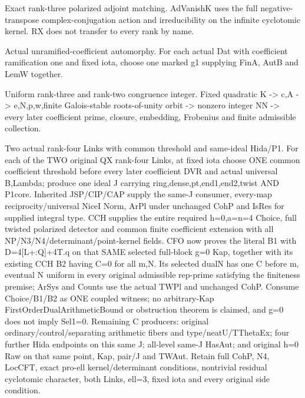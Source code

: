 \begin{description}[style=nextline]
\item[10. AD\_VANISH\_K\_MATCH --- D] Exact rank-three polarized adjoint matching. AdVanishK uses the full negative-transpose complex-conjugation action and irreducibility on the infinite cyclotomic kernel. RX does not transfer to every rank by name.

\item[11. AUT\_UNRAM\_COEF --- C] Actual unramified-coefficient automorphy. For each actual Dat with coefficient ramification one and fixed iota, choose one marked g1 supplying FinA, AutB and LemW together.

\item[12. CNR3 --- C] Uniform rank-three and rank-two congruence integer. Fixed quadratic K -> c,A -> e,N,p,w,finite Galois-stable roots-of-unity orbit -> nonzero integer NN -> every later coefficient prime, closure, embedding, Frobenius and finite admissible collection.

\item[13. COUNT\_II\_SUPPORT --- C] Two actual rank-four Links with common threshold and same-ideal Hida/P1. For each of the TWO original QX rank-four Links, at fixed iota choose ONE common coefficient threshold before every later coefficient DVR and actual universal B,Lambda; produce one ideal J carrying ring,dense,pt,end1,end2,twist AND P1core. Inherited JSP/CIP/CAP supply the same-J consumer, every-map reciprocity/universal NiceI Norm, ArPl under unchanged CohP and IsRes for supplied integral type. CCH supplies the entire required h=0,a=n=4 Choice, full twisted polarized detector and common finite coefficient extension with all NP/N3/N4/determinant/point-kernel fields. CFO now proves the literal B1 with D=4[L+:Q]+4T.q on that SAME selected full-block g=0 Kap, together with its existing CCH B2 having C=0 for all m,N. Its selected dualN has one C before m, eventual N uniform in every original admissible rep-prime satisfying the finiteness premise; ArSys and Counts use the actual TWPl and unchanged CohP. Consume Choice/B1/B2 as ONE coupled witness; no arbitrary-Kap FirstOrderDualArithmeticBound or obstruction theorem is claimed, and g=0 does not imply Sel1=0. Remaining C producers: original ordinary/control/separating arithmetic fibers and type/neatU/TThetaEx; four further Hida endpoints on this same J; all-level same-J HasAut; and original h=0 Raw on that same point, Kap, pair/J and TWAut. Retain full CohP, N4, LocCFT, exact pro-ell kernel/determinant conditions, nontrivial residual cyclotomic character, both Links, ell=3, fixed iota and every original side condition.


\end{description}
